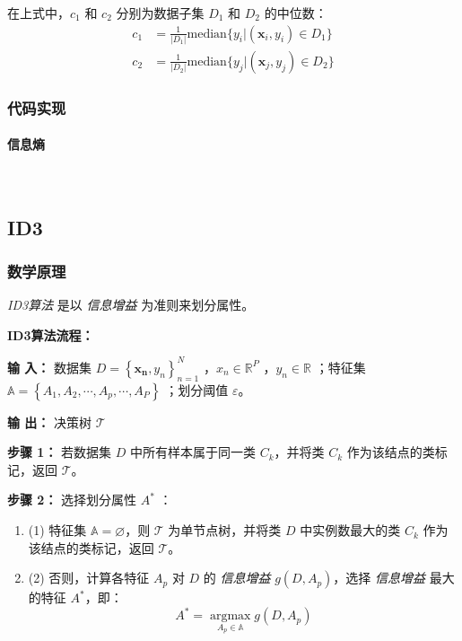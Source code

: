 \documentclass{ctexart}
\numberwithin{equation}{section}
\begin{document}
在上式中，$c_1$ 和 $c_2$ 分别为数据子集 $D_1$ 和 $D_2$ 的中位数：
\begin{subequations}
	\begin{align}
		c_1 &= \frac{1}{|D_1|} \text{median} \{y_i | (\boldsymbol{x}_i, y_i) \in D_1 \} \\
		c_2 &= \frac{1}{|D_2|} \text{median} \{y_j | (\boldsymbol{x}_j, y_j) \in D_2 \}
	\end{align}
\end{subequations}


\subsubsection{代码实现}

\paragraph{信息熵}~{}




\subsection{ID3}

\subsubsection{数学原理}

\emph{ID3算法} 是以 \emph{信息增益} 为准则来划分属性。

\textbf{ID3算法流程：}
 
\textbf{输 入：} 数据集 $D = \left\{ \boldsymbol{x_n}, y_n \right\} ^{N}_{n=1}$ ，$x_n \in \mathbb{R}^P$ ，$y_n \in \mathbb{R} $ ；特征集 $\mathbb{A} = \left\{ A_1, A_2, \cdots, A_p, \cdots, A_P \right\}$ ；划分阈值 $\varepsilon$。

\textbf{输 出：} 决策树 $\mathscr{T}$

\textbf{步骤 1：} 若数据集 $D$ 中所有样本属于同一类 $C_k$，并将类 $C_k$ 作为该结点的类标记，返回 $\mathscr{T}$。

\textbf{步骤 2：} 选择划分属性 $A^*$ ：
\begin{enumerate}[\qquad ]
	\item (1) 特征集 $\mathbb{A} = \varnothing$，则 $\mathscr{T}$ 为单节点树，并将类 $D$ 中实例数最大的类 $C_k$ 作为该结点的类标记，返回 $\mathscr{T}$。
	
	\item (2) 否则，计算各特征 $A_p$ 对 $D$ 的 \emph{信息增益} $g(D,A_p)$，选择 \emph{信息增益} 最大的特征 $A^*$，即：
	\begin{equation}
		A^* = \mathop{\arg\max}\limits_{A_p \in \mathbb{A}} g(D,A_p)
	\end{equation}
\end{enumerate}
\end{document}

